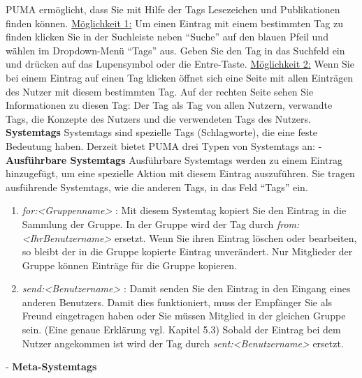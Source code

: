 PUMA ermöglicht, dass Sie mit Hilfe der Tags Lesezeichen und Publikationen finden können. \newline\newline
\underline{Möglichkeit 1:} Um einen Eintrag mit einem bestimmten Tag zu finden klicken Sie in der Suchleiste neben \enquote{Suche} auf den blauen Pfeil und wählen im Dropdown-Menü \enquote{Tags} aus. Geben Sie den Tag in das Suchfeld ein und drücken auf das Lupensymbol oder die Entre-Taste.\newline \newline
\underline{Möglichkeit 2:} Wenn Sie bei einem Eintrag auf einen Tag klicken öffnet sich eine Seite mit allen Einträgen des Nutzer mit diesem bestimmten Tag. Auf der rechten Seite sehen Sie Informationen zu diesen Tag: Der Tag als Tag von allen Nutzern, verwandte Tags, die Konzepte des Nutzers und die verwendeten Tags des Nutzers. 
\newline
\newline
\textbf{Systemtags}
\newline
Systemtags sind spezielle Tags (Schlagworte), die eine feste Bedeutung haben. Derzeit bietet PUMA drei Typen von Systemtags an: \newline\newline
- \textbf{Ausführbare Systemtags}\newline
Ausführbare Systemtags werden zu einem Eintrag hinzugefügt, um eine spezielle Aktion mit diesem Eintrag auszuführen. Sie tragen ausführende Systemtags, wie die anderen Tags, in das Feld \enquote{Tags} ein. 
\begin{enumerate}
    \item \textit{for:<Gruppenname>} : Mit diesem Systemtag kopiert Sie den Eintrag in die Sammlung der Gruppe. In der Gruppe wird der Tag durch \textit{from:<IhrBenutzername>} ersetzt. Wenn Sie ihren Eintrag löschen oder bearbeiten, so bleibt der in die Gruppe kopierte Eintrag unverändert. Nur Mitglieder der Gruppe können Einträge für die Gruppe kopieren.
    \item \textit{send:<Benutzername>} : Damit senden Sie den Eintrag in den Eingang eines anderen Benutzers. Damit dies funktioniert, muss der Empfänger Sie als Freund eingetragen haben oder Sie müssen Mitglied in der gleichen Gruppe sein. (Eine genaue Erklärung vgl. Kapitel 5.3) Sobald der Eintrag bei dem Nutzer angekommen ist wird der Tag durch \textit{sent:<Benutzername>} ersetzt.
\end{enumerate}
- \textbf{Meta-Systemtags}
\newline   
